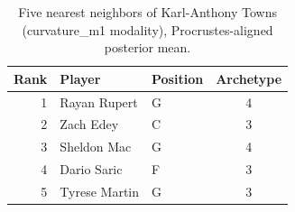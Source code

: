 \begin{table}[htbp]
  \centering\small
  \begin{tabular}{rllc}
    \toprule
    Rank & Player & Position & Archetype \\
    \midrule
    1 & Rayan Rupert & G & 4 \\
    2 & Zach Edey & C & 3 \\
    3 & Sheldon Mac & G & 4 \\
    4 & Dario Saric & F & 3 \\
    5 & Tyrese Martin & G & 3 \\
    \bottomrule
  \end{tabular}
  \caption{Five nearest neighbors of Karl-Anthony Towns (curvature_m1 modality), Procrustes-aligned posterior mean.}
  \label{tab:Karl_Anthony_Towns_neighbors_curvature_m1}
\end{table}

